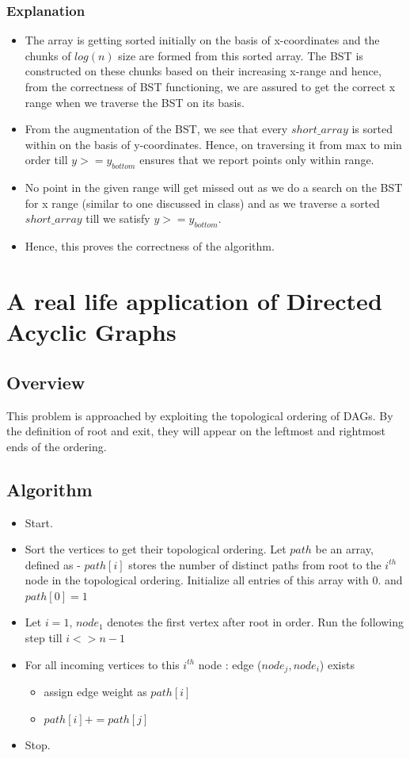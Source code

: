 \documentclass{article}
\begin{document}
\subsubsection{Explanation}
\begin{itemize}
\item The array is getting sorted initially on the basis of x-coordinates and the chunks of $log(n)$ size are formed from this sorted array. The BST is constructed on these chunks based on their increasing x-range and hence, from the correctness of BST functioning, we are assured to get the correct x range when we traverse the BST on its basis.
\item From the augmentation of the BST, we see that every $short\_array$ is sorted within on the basis of y-coordinates. Hence, on traversing it from max to min order till $y>=y_{bottom}$ ensures that we report points only within range.
\item No point in the given range will get missed out as we do a search on the BST for x range (similar to one discussed in class) and as we traverse a sorted $short\_array$ till we satisfy $y>=y_{bottom}$. 
\item Hence, this proves the correctness of the algorithm. 
\end{itemize}
\newpage
\section{A real life application of Directed Acyclic Graphs}
\subsection{Overview}
This problem is approached by exploiting the topological ordering of DAGs. By the definition of root and exit, they will appear on the leftmost and rightmost ends of the ordering.
\subsection{Algorithm}
\begin{itemize}
\item Start.
\item Sort the vertices to get their topological ordering. Let $path$ be an array, defined as - $path[i]$ stores the number of distinct paths from root to the $i^{th}$ node in the topological ordering. Initialize all entries of this array with $0$. and $path[0] = 1$
\item Let $i=1$, $node_1$ denotes the first vertex after root in order. Run the following step till $i <> n-1$
\item For all incoming vertices to this $i^{th}$ node : edge ($node_j, node_i$) exists
\begin{itemize}
\item assign edge weight as $path[i]$
\item $path[i] += path[j]$
\end{itemize} 
\item Stop.
\end{itemize}
\end{document}
